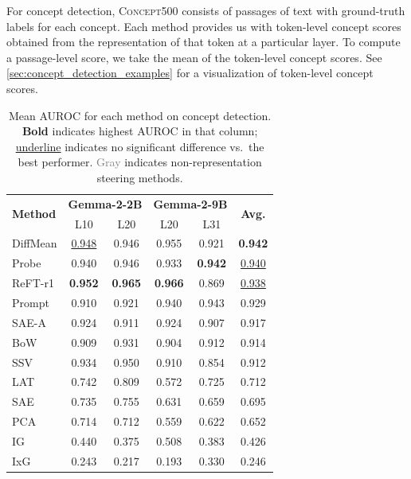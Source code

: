 \documentclass{article}
\theoremstyle{plain}
\theoremstyle{definition}
\theoremstyle{remark}
\newcommand{\methodtag}[2]{%
  \tikz[baseline=(char.base)]{%
    \node[
      fill=#1,
      rounded corners=2pt,
      text=white,
      font=\bfseries,
      minimum width=1em,
      minimum height=1em,
      align=center,
      inner sep=0pt
    ](char){#2};%
  }%
}
\newcommand{\concepttag}{\protect\methodtag{conceptcolor}{C}}
\begin{document}
For concept detection, \textsc{Concept500} consists of passages of text with ground-truth labels for each concept. Each method provides us with token-level concept scores obtained from the representation of that token at a particular layer. To compute a passage-level score, we take the mean of the token-level concept scores. See \cref{sec:concept_detection_examples} for a visualization of token-level concept scores.

\begin{table}[!t]
    \small
    \centering
\begin{tabular}{lccccc}
\toprule
\multirow[t]{2}{*}{\textbf{Method}} & \multicolumn{2}{c}{\textbf{Gemma-2-2B}}  & \multicolumn{2}{c}{\textbf{Gemma-2-9B}} & \multirow[t]{2}{*}{\textbf{Avg.}} \\
& \multicolumn{1}{c}{L10} & \multicolumn{1}{c}{L20} & \multicolumn{1}{c}{L20} & \multicolumn{1}{c}{L31} \\
\midrule
DiffMean & \underline{0.948} & 0.946 & 0.955 & 0.921 & \textbf{0.942} \\
Probe & 0.940 & 0.946 & 0.933 & \textbf{0.942} & \underline{0.940} \\
ReFT-r1 & \textbf{0.952} & \textbf{0.965} & \textbf{0.966} & 0.869 & \underline{0.938} \\
\rowcolor{gray!20} Prompt & 0.910 & 0.921 & 0.940 & 0.943 & 0.929 \\
SAE-A & 0.924 & 0.911 & 0.924 & 0.907 & 0.917 \\
\rowcolor{gray!20} BoW & 0.909 & 0.931 & 0.904 & 0.912 & 0.914 \\
SSV & 0.934 & 0.950 & 0.910 & 0.854 & 0.912 \\
LAT & 0.742 & 0.809 & 0.572 & 0.725 & 0.712 \\
SAE & 0.735 & 0.755 & 0.631 & 0.659 & 0.695 \\
PCA & 0.714 & 0.712 & 0.559 & 0.622 & 0.652 \\
IG & 0.440 & 0.375 & 0.508 & 0.383 & 0.426 \\
IxG & 0.243 & 0.217 & 0.193 & 0.330 & 0.246 \\
\bottomrule
\end{tabular}
    \caption{\concepttag{} Mean AUROC for each method on concept detection. \textbf{Bold} indicates highest AUROC in that column; \underline{underline} indicates no significant difference vs.~the best performer. \textcolor{gray}{Gray} indicates non-representation steering methods.}
    \label{tab:roc-auc}
\end{table}
\end{document}
